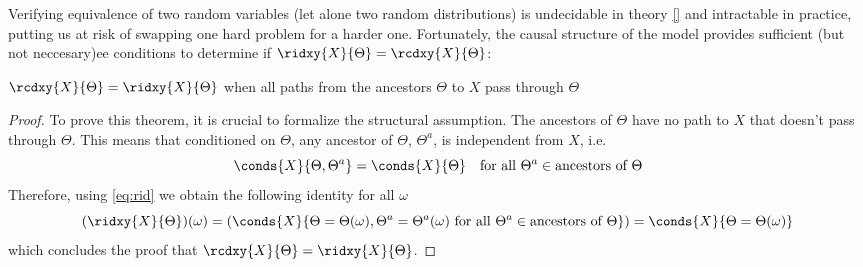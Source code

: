 Verifying equivalence of two random variables (let alone two random distributions) is undecidable in theory \ref{} and intractable in practice, putting us at risk of swapping one hard problem for a harder one.
Fortunately, the causal structure of the model provides sufficient (but not neccesary)ee conditions to determine if $\ridxy{X}{\Theta} = \rcdxy{X}{\Theta}$:

\begin{theorem} $\rcdxy{X}{\Theta} = \ridxy{X}{\Theta}$ when all paths from the ancestors $\Theta$ to $X$ pass through $\Theta$
\end{theorem}
\begin{proof}
To prove this theorem, it is crucial to formalize the structural assumption. The ancestors of $\Theta$ have no path to $X$ that doesn't pass through $\Theta$. This means that conditioned on $\Theta$, any ancestor of $\Theta$, $\Theta^a$, is independent from $X$, i.e.
\begin{equation*}
\conds{X}{\Theta, \Theta^a} = \conds{X}{\Theta} \quad \text{for all } \Theta^a \in \text{ancestors of } \Theta
\end{equation*}
Therefore, using \eqref{eq:rid} we obtain the following identity for all $\omega$
\begin{equation*}
(\ridxy{X}{\Theta})(\omega) = (\conds{X}{\Theta = \Theta(\omega), \Theta^a = \Theta^a(\omega) \text{ for all } \Theta^a \in \text{ancestors of } \Theta}) = \conds{X}{\Theta = \Theta(\omega)}
\end{equation*}
which concludes the proof that $\rcdxy{X}{\Theta} = \ridxy{X}{\Theta}$.
\end{proof}